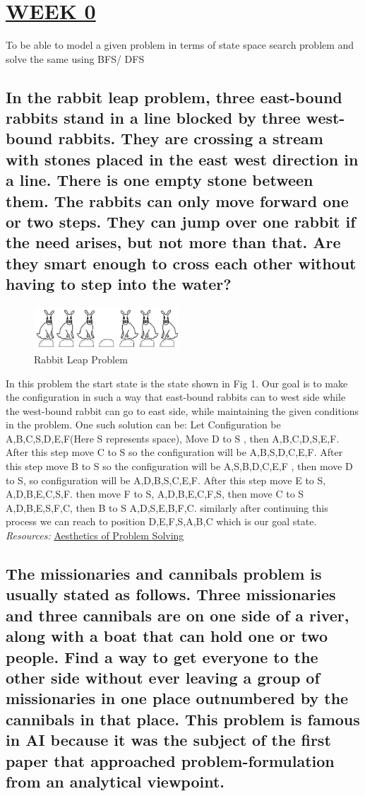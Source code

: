\documentclass[15pt,journal]{IEEEtran}
\begin{document}
\section{\large{\underline{WEEK 0}}}
To be able to model a given problem in terms of state space search problem and solve the same using BFS/ DFS
\subsection{In the rabbit leap problem, three east-bound rabbits stand in a line blocked by three west-bound rabbits. They are crossing a stream with stones placed in the east west direction in a line. There is one empty stone between them. The rabbits can only move forward one or two steps. They can jump over one rabbit if the need arises, but not more than that. Are they smart enough to cross each other without having to step into the water? 
}
\begin{figure}[H]%
\begin {center}
\includegraphics[width=0.48\textwidth]{images/rabbit .jpg}
\caption{Rabbit Leap Problem} %
\label{fig:ecg}
\end {center}
\end{figure}

In this problem the start state is the state shown in Fig 1. Our goal is to make the configuration in such a way that east-bound rabbits can to west side while the west-bound rabbit can go to east side, while maintaining the given conditions in the problem. One such solution can be:
Let Configuration be A,B,C,S,D,E,F(Here S represents space), Move D to S , then A,B,C,D,S,E,F. After this step move C to S so the configuration will be A,B,S,D,C,E,F. After this step move B to S so the configuration will be A,S,B,D,C,E,F , then move D to S, so configuration will be A,D,B,S,C,E,F. After this step move E to S, A,D,B,E,C,S,F. then move F to S, A,D,B,E,C,F,S, then move C to S A,D,B,E,S,F,C, then B to S A,D,S,E,B,F,C. similarly after continuing this process we can reach to position D,E,F,S,A,B,C which is our goal state.
\emph{Resources:} \href{https://www.thinkingapplied.com/frog_folder/frog.htm}{ Aesthetics of Problem Solving}

\subsection{The missionaries and cannibals problem is usually stated as follows. Three missionaries and three cannibals are on one side of a river, along with a boat that can hold one or two people. Find a way to get everyone to the other side without ever leaving a group of missionaries in one place outnumbered by the cannibals in that place. This problem is famous in AI because it was the subject of the first paper that approached problem-formulation from an analytical viewpoint. 
}
\end{document}
